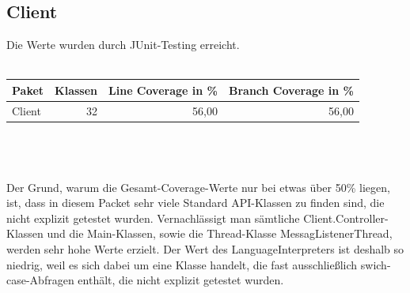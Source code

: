 \documentclass[a4paper]{article}
\begin{document}
	\subsection{Client}
	Die Werte wurden durch JUnit-Testing erreicht.
 \ \\ \ \\ 	
	\noindent
	\begin{tabular}{|l|r|r|r|} \hline
	Paket & Klassen & Line Coverage in \% & Branch Coverage in \% \\ \hline \hline
	Client & \multicolumn{1}{r|}{32} & \multicolumn{1}{r|}{56,00} & \multicolumn{1}{r|}{56,00} \\ \hline
	\end{tabular}
 \ \\ \ \\ \ \\
 Der Grund, warum die Gesamt-Coverage-Werte nur bei etwas über 50\% liegen, ist, dass in diesem Packet sehr viele Standard API-Klassen zu finden sind, die nicht explizit getestet wurden. Vernachlässigt man sämtliche Client.Controller-Klassen und die Main-Klassen, sowie die Thread-Klasse MessagListenerThread, werden sehr hohe Werte erzielt. Der Wert des LanguageInterpreters ist deshalb so niedrig, weil es sich dabei um eine Klasse handelt, die fast ausschließlich swich-case-Abfragen enthält, die nicht explizit getestet wurden.\\
 \ \\
	\noindent	
\end{document}
